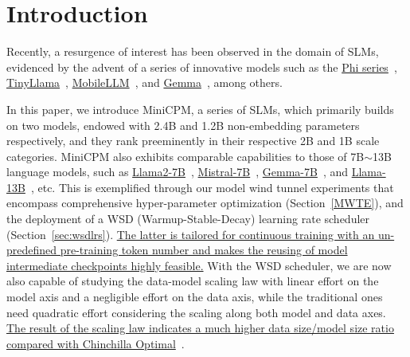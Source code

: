 \section{Introduction}

Recently, a resurgence of interest has been observed in the domain of SLMs, evidenced by the advent of a series of innovative models such as the \uline{Phi series}~\citep{gunasekar2023textbooks, li2023textbooks, Javaheripi2023Phi2}, \uline{TinyLlama}~\citep{zhang2024tinyllama}, \uline{MobileLLM}~\citep{liu2024mobilellm}, and \uline{Gemma}~\citep{Banks2024Gemma}, among others.

In this paper, we introduce MiniCPM, a series of SLMs, which primarily builds on two models, endowed with 2.4B and 1.2B non-embedding parameters respectively, and they rank preeminently in their respective 2B and 1B scale categories. MiniCPM also exhibits comparable capabilities to those of 7B$\sim$13B language models, such as \uline{Llama2-7B}~\citep{touvron2023llama}, \uline{Mistral-7B}~\citep{jiang2023mistral}, \uline{Gemma-7B}~\citep{Banks2024Gemma}, and \uline{Llama-13B}~\citep{touvron2023llama}, etc. This is exemplified through our model wind tunnel experiments that encompass comprehensive hyper-parameter optimization (Section~\ref{MWTE}), and the deployment of a WSD (Warmup-Stable-Decay) learning rate scheduler (Section~\ref{sec:wsdlrs}). \uline{The latter is tailored for continuous training with an un-predefined pre-training token number and makes the reusing of model intermediate checkpoints highly feasible.} With the WSD scheduler, we are now also capable of studying the data-model scaling law with linear effort on the model axis and a negligible effort on the data axis, while the traditional ones need quadratic effort considering the scaling along both model and data axes. \uline{The result of the scaling law indicates a much higher data size/model size ratio compared with Chinchilla Optimal}~\citep{hoffmann2022training}.
